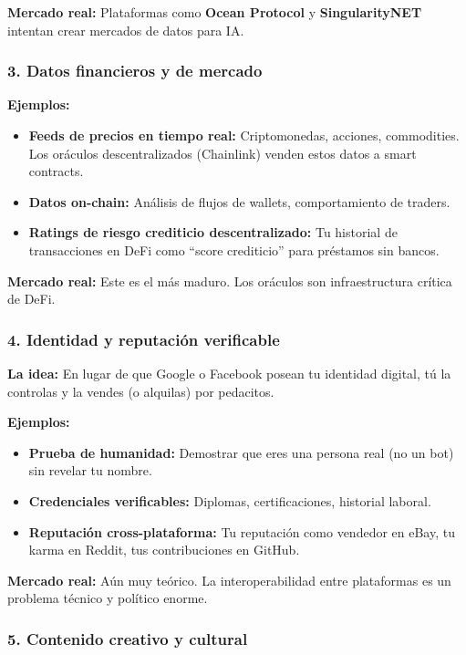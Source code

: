 \documentclass[12pt,a4paper]{article}
\begin{document}
\textbf{Mercado real:} Plataformas como \textbf{Ocean Protocol} y \textbf{SingularityNET} intentan crear mercados de datos para IA.

\subsubsection{3. Datos financieros y de mercado}

\textbf{Ejemplos:}
\begin{itemize}
    \item \textbf{Feeds de precios en tiempo real:} Criptomonedas, acciones, commodities. Los or\'{a}culos descentralizados (Chainlink) venden estos datos a smart contracts.
    \item \textbf{Datos on-chain:} An\'{a}lisis de flujos de wallets, comportamiento de traders.
    \item \textbf{Ratings de riesgo crediticio descentralizado:} Tu historial de transacciones en DeFi como ``score crediticio'' para pr\'{e}stamos sin bancos.
\end{itemize}

\textbf{Mercado real:} Este es el m\'{a}s maduro. Los or\'{a}culos son infraestructura cr\'{i}tica de DeFi.

\subsubsection{4. Identidad y reputaci\'{o}n verificable}

\textbf{La idea:} En lugar de que Google o Facebook posean tu identidad digital, t\'{u} la controlas y la vendes (o alquilas) por pedacitos.

\textbf{Ejemplos:}
\begin{itemize}
    \item \textbf{Prueba de humanidad:} Demostrar que eres una persona real (no un bot) sin revelar tu nombre.
    \item \textbf{Credenciales verificables:} Diplomas, certificaciones, historial laboral.
    \item \textbf{Reputaci\'{o}n cross-plataforma:} Tu reputaci\'{o}n como vendedor en eBay, tu karma en Reddit, tus contribuciones en GitHub.
\end{itemize}

\textbf{Mercado real:} A\'{u}n muy te\'{o}rico. La interoperabilidad entre plataformas es un problema t\'{e}cnico y pol\'{i}tico enorme.

\subsubsection{5. Contenido creativo y cultural}
\end{document}
